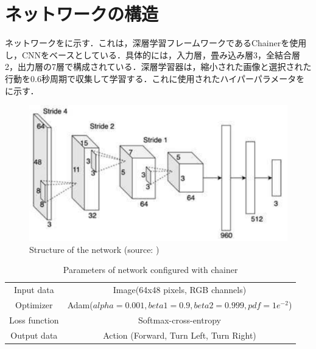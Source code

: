 
\section{ネットワークの構造}

  ネットワークをに示す．これは，深層学習フレームワークであるChainer\cite{chainer}を使用し，CNNをベースとしている．具体的には，入力層，畳み込み層3，全結合層2，出力層の7層で構成されている．深層学習器は，縮小された画像と選択された行動を0.6秒周期で収集して学習する．これに使用されたハイパーパラメータをに示す．

  \begin{figure}[h]
    \centering
    \includegraphics[keepaspectratio, scale=1.10] {images/pdf/okada_network}
    \caption[Structure of the network]{Structure of the network (source: \cite{okada})}
    \label{Fig:okada_network}
  \end{figure}

  \begin{table}[hbtp]
    \caption{Parameters of network configured with chainer}
    \label{tab:Parameters of network configured with chainer}
    \centering
    \begin{tabular}{cc}
      \hline
      Input data & Image(64x48 pixels, RGB channels) \\
      Optimizer & Adam($alpha = 0.001, beta1 = 0.9, beta2 =  0.999, pdf = 1e^{-2}$)\\
      Loss function & Softmax-cross-entropy\\
      Output data & Action (Forward, Turn Left, Turn Right)\\
      \hline
    \end{tabular}
  \end{table}

\newpage